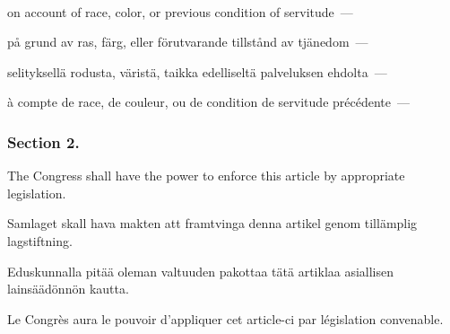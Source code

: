 \documentclass[a4paper,landscape,12pt]{article}
\begin{document}
~

\begin{minipage}[t]{0.22\textwidth}
on account of race, color, or previous condition of servitude~---
\end{minipage}\textwidth
\begin{minipage}[t]{0.22\textwidth}
på grund av ras, färg, eller förutvarande tillstånd av tjänedom~---
\end{minipage}\textwidth
\begin{minipage}[t]{0.22\textwidth}
selityksellä rodusta, väristä, taikka edelliseltä palveluksen ehdolta~---
\end{minipage}\textwidth
\begin{minipage}[t]{0.22\textwidth}
à compte de race, de couleur, ou de condition de servitude précédente~---
\end{minipage}

\subsubsection*{Section 2.}
\begin{minipage}[t]{0.22\textwidth}
The Congress shall have the power to enforce this article by appropriate legislation.
\end{minipage}\textwidth
\begin{minipage}[t]{0.22\textwidth}
Samlaget skall hava makten att framtvinga denna artikel genom tillämplig lagstiftning.
\end{minipage}\textwidth
\begin{minipage}[t]{0.22\textwidth}
Eduskunnalla pitää oleman valtuuden pakottaa tätä artiklaa asiallisen lainsäädönnön kautta.
\end{minipage}\textwidth
\begin{minipage}[t]{0.22\textwidth}
Le Congrès aura le pouvoir d'appliquer cet article-ci par législation convenable.
\end{minipage}

~
\end{document}

